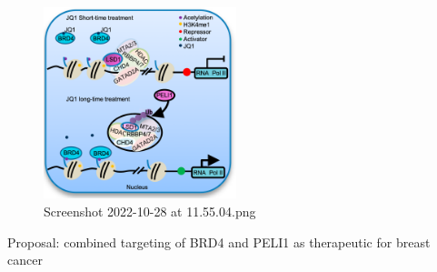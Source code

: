 \begin{figure}
\centering
\includegraphics[width=0.5\textwidth]{../_resources/Screenshot_2022-10-28_at_11-55-04.png}
\caption{Screenshot 2022-10-28 at 11.55.04.png}
\end{figure}

Proposal: combined targeting of BRD4 and PELI1 as therapeutic for breast
cancer
